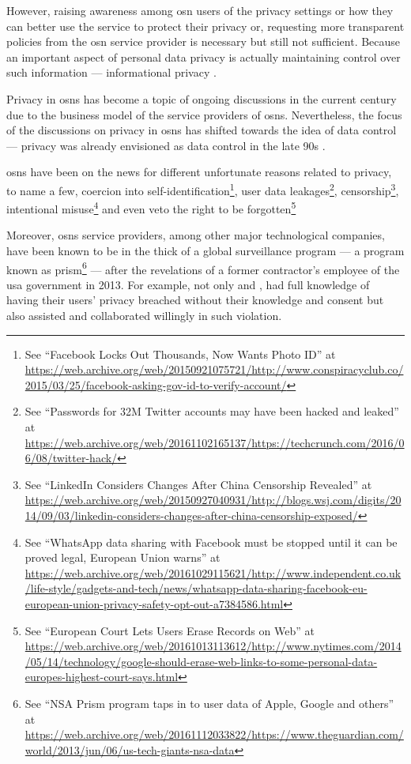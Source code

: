 \documentclass[showtrims, oldfontcommands]{kthesis}
\begin{document}
However, raising awareness among \ac{osn} users of the privacy settings or how they 
can better use the service to protect their privacy or, requesting more transparent 
policies from the \ac{osn} service provider is necessary but still not sufficient. 
Because an important aspect of personal data privacy is actually maintaining control 
over such information --- informational privacy \cite{Cavoukian96}.

Privacy in \acp{osn} has become a topic of ongoing discussions in the current century 
due to the business model of the service providers of \acp{osn}. Nevertheless, the 
focus of the discussions on privacy in \acp{osn} has shifted towards the idea of 
data control --- privacy was already envisioned as data control in the late 90s 
\cite{Allen99}.

\acp{osn} have been on the news for different unfortunate reasons related to privacy, 
to name a few, coercion into self-identification\footnote{See ``Facebook Locks Out Thousands, Now Wants Photo ID'' at \url{https://web.archive.org/web/20150921075721/http://www.conspiracyclub.co/2015/03/25/facebook-asking-gov-id-to-verify-account/}}, 
user data leakages\footnote{See ``Passwords for 32M Twitter accounts may have been hacked and leaked'' at \url{https://web.archive.org/web/20161102165137/https://techcrunch.com/2016/06/08/twitter-hack/}}, 
censorship\footnote{See ``LinkedIn Considers Changes After China Censorship Revealed'' at \url{https://web.archive.org/web/20150927040931/http://blogs.wsj.com/digits/2014/09/03/linkedin-considers-changes-after-china-censorship-exposed/}}, 
intentional misuse\footnote{See ``WhatsApp data sharing with Facebook must be stopped until it can be proved legal, European Union warns'' at \url{https://web.archive.org/web/20161029115621/http://www.independent.co.uk/life-style/gadgets-and-tech/news/whatsapp-data-sharing-facebook-eu-european-union-privacy-safety-opt-out-a7384586.html}} 
and even veto the right to be forgotten\footnote{See ``European Court Lets Users Erase Records on Web'' at \url{https://web.archive.org/web/20161013113612/http://www.nytimes.com/2014/05/14/technology/google-should-erase-web-links-to-some-personal-data-europes-highest-court-says.html}}

Moreover, \acp{osn} service providers, among other major technological companies, 
have been known to be in the thick of a global surveillance program --- a program 
known as \Ac{prism}\footnote{See ``NSA Prism program taps in to user data of Apple, Google and others'' at \url{https://web.archive.org/web/20161112033822/https://www.theguardian.com/world/2013/jun/06/us-tech-giants-nsa-data}} --- 
after the revelations of a former contractor's employee of the \ac{usa} government 
in 2013. For example, not only \Facebook and \Google, had full knowledge of having 
their users' privacy breached without their knowledge and consent but also assisted 
and collaborated willingly in such violation.
\end{document}
